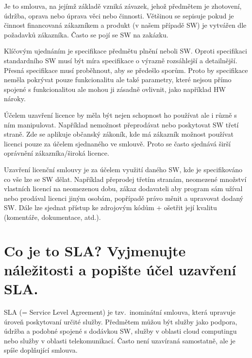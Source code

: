 Je to smlouva, na jejímž základě vzniká závazek, jehož předmětem je zhotovení, údržba, oprava nebo úprava věci nebo činnosti. Většinou se sepisuje pokud je činnost financovaná zákazníkem a produkt (v našem případě SW) je vytvářen dle požadavků zákazníka. Často se pojí se SW na zakázku.

Klíčovým ujednáním je specifikace předmětu plnění neboli SW\@. Oproti specifikaci standardního SW musí být míra specifikace o výrazně rozsáhlejší a detailnější. Přesná specifikace musí proběhnout, aby se předešlo sporům. Proto by specifikace neměla pokrývat pouze funkcionalitu ale také parametry, které nejsou přímo spojené s funkcionalitou ale mohou ji zásadně ovlivnit, jako například HW nároky.

Účelem uzavření licence by měla být nejen schopnost ho používat ale i různě s ním manipulovat. Například nemožnost přeprodávat nebo poskytovat SW třetí straně. Zde se aplikuje občanský zákoník, kde má zákazník možnost používat licenci pouze za účelem sjednaného ve smlouvě. Proto se často sjednává širší oprávnění zákazníka/široká licence. 

Uzavření licenční smlouvy je za účelem využití daného SW, kde je specifikováno co vše lze se SW dělat. Například přeprodej třetím stranám, neomezené množství vlastních licencí na neomezenou dobu, zákaz dodavateli aby program sám užíval nebo prodával licenci jiným osobám, popřípadě právo měnit a upravovat dodaný SW. Dále lze sjednat přístup ke zdrojovým kódům + ošetřit její kvalitu (komentáře, dokumentace, atd.).


\newpage
\section{Co je to SLA\@? Vyjmenujte náležitosti a popište účel uzavření SLA.}

SLA (= Service Level Agreement) je tzv.\ inominátní smlouva, která upravuje úroveň poskytovaní určité služby. Předmětem můžou být služby jako podpora, údržba a podobné spojené s dodávkou SW, služby v oblasti cloud computingu nebo služby v oblasti telekomunikací. Často není uzavíraná samostatně, ale je spíše doplňující smlouva.
\newline


